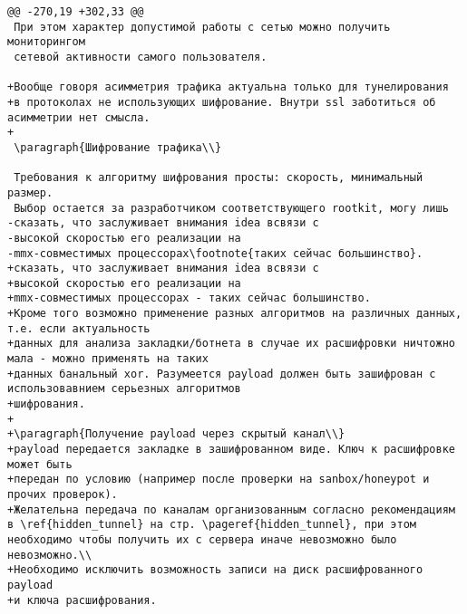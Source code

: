 \begin{verbatim}
@@ -270,19 +302,33 @@
 При этом характер допустимой работы с сетью можно получить мониторингом
 сетевой активности самого пользователя.

+Вообще говоря асимметрия трафика актуальна только для тунелирования
+в протоколах не использующих шифрование. Внутри ssl заботиться об асимметрии нет смысла.
+
 \paragraph{Шифрование трафика\\}

 Требования к алгоритму шифрования просты: скорость, минимальный размер.
 Выбор остается за разработчиком соответствующего rootkit, могу лишь
-сказать, что заслуживает внимания idea всвязи с
-высокой скоростью его реализации на
-mmx-совместимых процессорах\footnote{таких сейчас большинство}.
+сказать, что заслуживает внимания idea всвязи с
+высокой скоростью его реализации на
+mmx-совместимых процессорах - таких сейчас большинство.
+Кроме того возможно применение разных алгоритмов на различных данных, т.е. если актуальность
+данных для анализа закладки/ботнета в случае их расшифровки ничтожно мала - можно применять на таких
+данных банальный xor. Разумеется payload должен быть зашифрован с использовавнием серьезных алгоритмов
+шифрования.
+
+\paragraph{Получение payload через скрытый канал\\}
+payload передается закладке в зашифрованном виде. Ключ к расшифровке может быть
+передан по условию (например после проверки на sanbox/honeypot и прочих проверок).
+Желательна передача по каналам организованным согласно рекомендациям в \ref{hidden_tunnel} на стр. \pageref{hidden_tunnel}, при этом необходимо чтобы получить их с сервера иначе невозможно было невозможно.\\
+Необходимо исключить возможность записи на диск расшифрованного payload
+и ключа расшифрования.


\end{verbatim}
